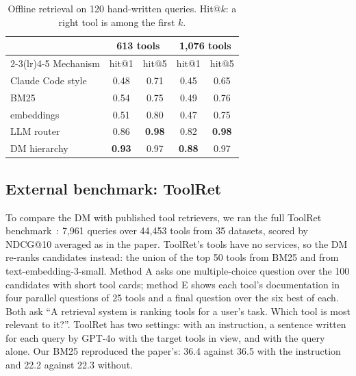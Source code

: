 \documentclass[11pt]{article}
\begin{document}
\begin{table}[t]
\centering\small
\caption{Offline retrieval on 120 hand-written queries. Hit@$k$: a right tool is among the first $k$.}
\label{tab:retrieval}
\setlength{\tabcolsep}{6pt}
\begin{tabular}{@{}lcccc@{}}
\toprule
& \multicolumn{2}{c}{613 tools} & \multicolumn{2}{c}{1{,}076 tools} \\
\cmidrule(lr){2-3}\cmidrule(lr){4-5}
Mechanism & hit@1 & hit@5 & hit@1 & hit@5 \\
\midrule
Claude Code style & 0.48 & 0.71 & 0.45 & 0.65 \\
BM25 & 0.54 & 0.75 & 0.49 & 0.76 \\
embeddings & 0.51 & 0.80 & 0.47 & 0.75 \\
LLM router & 0.86 & \textbf{0.98} & 0.82 & \textbf{0.98} \\
DM hierarchy & \textbf{0.93} & 0.97 & \textbf{0.88} & 0.97 \\
\bottomrule
\end{tabular}
\end{table}

\subsection{External benchmark: ToolRet}\label{sec:toolret}
To compare the DM with published tool retrievers, we ran the full ToolRet benchmark~\citep{shi2025toolret}: 7{,}961
queries over 44{,}453 tools from 35 datasets, scored by NDCG@10 averaged as in the paper. ToolRet's tools have no
services, so the DM re-ranks candidates instead: the union of the top 50 tools from BM25 and from
text-embedding-3-small. Method A asks one multiple-choice question over the 100 candidates with short tool cards;
method E shows each tool's documentation in four parallel questions of 25 tools and a final question over the six best
of each. Both ask ``A retrieval system is ranking tools for a user's task. Which tool is most relevant to it?''.
ToolRet has two settings: with an instruction, a sentence written for each query by GPT-4o with the target tools in
view, and with the query alone. Our BM25 reproduced the paper's: 36.4 against 36.5 with the instruction and 22.2 against 22.3 without.
\end{document}
